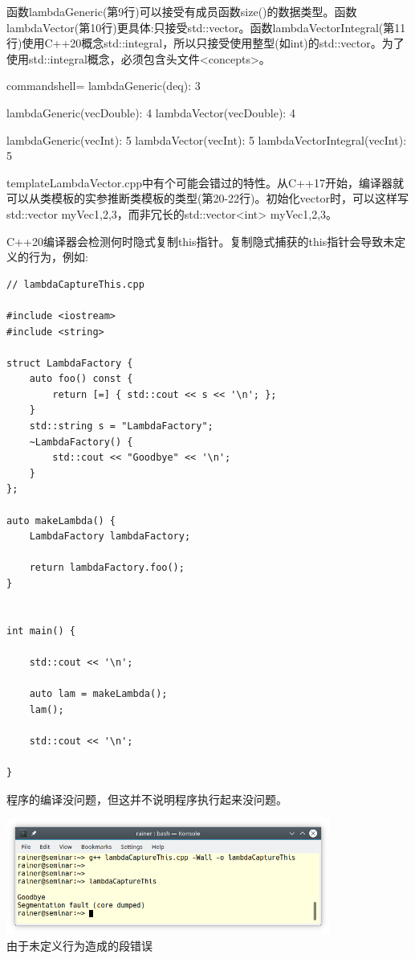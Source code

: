 函数lambdaGeneric(第9行)可以接受有成员函数size()的数据类型。函数lambdaVector(第10行)更具体:只接受std::vector。函数lambdaVectorIntegral(第11行)使用C++20概念std::integral，所以只接受使用整型(如int)的std::vector。为了使用std::integral概念，必须包含头文件<concepts>。

\begin{tcblisting}{commandshell={}}
lambdaGeneric(deq): 3

lambdaGeneric(vecDouble): 4
lambdaVector(vecDouble): 4

lambdaGeneric(vecInt): 5
lambdaVector(vecInt): 5
lambdaVectorIntegral(vecInt): 5
\end{tcblisting}

\begin{tcolorbox}[breakable,enhanced jigsaw,colback=mygreen!5!white,colframe=mygreen!75!black,title={类模板参数的推导}]
templateLambdaVector.cpp中有个可能会错过的特性。从C++17开始，编译器就可以从类模板的实参推断类模板的类型(第20-22行)。初始化vector时，可以这样写std::vector myVec{1,2,3}，而非冗长的std::vector<int> myVec{1,2,3}。
\end{tcolorbox}


C++20编译器会检测何时隐式复制this指针。复制隐式捕获的this指针会导致未定义的行为，例如:

\begin{lstlisting}[style=styleCXX]
// lambdaCaptureThis.cpp

#include <iostream>
#include <string>

struct LambdaFactory {
	auto foo() const {
		return [=] { std::cout << s << '\n'; };
	}
	std::string s = "LambdaFactory";
	~LambdaFactory() {
		std::cout << "Goodbye" << '\n';
	}
};

auto makeLambda() {
	LambdaFactory lambdaFactory; 
	
	return lambdaFactory.foo();
}


int main() {

	std::cout << '\n';
	
	auto lam = makeLambda();
	lam();
	
	std::cout << '\n';

}
\end{lstlisting}

程序的编译没问题，但这并不说明程序执行起来没问题。

\begin{center}
\includegraphics[width=0.8\textwidth]{content/3/chapter4/images/42.png}\\
由于未定义行为造成的段错误
\end{center}

